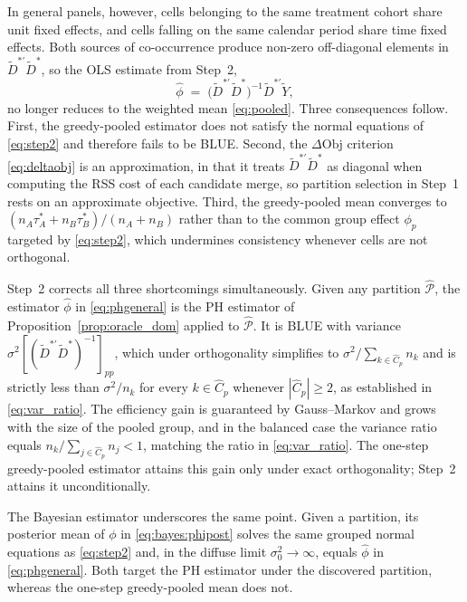 \documentclass[margin=5in, 12pt]{article}
\newcommand{\1}{\mathbbm{1}}
\begin{document}
  In general panels, however, cells belonging to the same treatment cohort share unit fixed effects, and cells falling on the
  same calendar period share time fixed effects. Both sources of co-occurrence produce non-zero off-diagonal elements in
  $\tilde{D}^{*\prime}\tilde{D}^*$, so the OLS estimate from Step~2,
  \begin{equation}
    \hat{\phi} \;=\; \bigl(\tilde{D}^{*\prime}\tilde{D}^*\bigr)^{-1}\tilde{D}^{*\prime}\tilde{Y},
    \label{eq:phgeneral}
  \end{equation}
  no longer reduces to the weighted mean \eqref{eq:pooled}. Three consequences follow. First, the greedy-pooled estimator does
  not satisfy the normal equations of \eqref{eq:step2} and therefore fails to be BLUE. Second, the $\Delta\mathrm{Obj}$ criterion
   \eqref{eq:deltaobj} is an approximation, in that it treats $\tilde{D}^{*\prime}\tilde{D}^*$ as diagonal when computing the RSS cost of
   each candidate merge, so partition selection in Step~1 rests on an approximate objective. Third, the greedy-pooled mean
  converges to $(n_A\tau_A^* + n_B\tau_B^*)/(n_A + n_B)$ rather than to the common group effect $\phi_p$ targeted by
  \eqref{eq:step2}, which undermines consistency whenever cells are not orthogonal.

  Step~2 corrects all three shortcomings simultaneously. Given any partition $\hat{\mathcal{P}}$, the estimator $\hat{\phi}$ in
  \eqref{eq:phgeneral} is the PH estimator of Proposition~\ref{prop:oracle_dom} applied to $\hat{\mathcal{P}}$. It is BLUE with variance
  $\sigma^2[(\tilde{D}^{*\prime}\tilde{D}^*)^{-1}]_{pp}$, which under orthogonality simplifies to $\sigma^2/\sum_{k \in
  \hat{C}_p} n_k$ and is strictly less than $\sigma^2/n_k$ for every $k \in \hat{C}_p$ whenever $|\hat{C}_p| \geq 2$, as
  established in \eqref{eq:var_ratio}. The efficiency gain is guaranteed by Gauss--Markov and grows with the size of the pooled
  group, and in the balanced case the variance ratio equals $n_k/\sum_{j \in \hat{C}_p} n_j < 1$, matching the ratio in
  \eqref{eq:var_ratio}. The one-step greedy-pooled estimator attains this gain only under exact orthogonality; Step~2 attains it
  unconditionally.

  The Bayesian estimator underscores the same point. Given a partition, its posterior mean of $\phi$ in \eqref{eq:bayes:phipost} solves the same grouped normal equations as \eqref{eq:step2} and, in the diffuse limit $\sigma_0^2 \to \infty$, equals $\hat{\phi}$ in \eqref{eq:phgeneral}. Both target the PH estimator under the discovered partition, whereas the one-step greedy-pooled mean does not.
\end{document}
